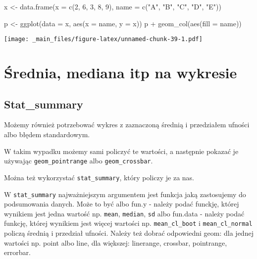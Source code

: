 \documentclass[
]{book}
\newenvironment{Shaded}{\begin{snugshade}}{\end{snugshade}}
\newcommand{\AttributeTok}[1]{\textcolor[rgb]{0.77,0.63,0.00}{#1}}
\newcommand{\DecValTok}[1]{\textcolor[rgb]{0.00,0.00,0.81}{#1}}
\newcommand{\FunctionTok}[1]{\textcolor[rgb]{0.00,0.00,0.00}{#1}}
\newcommand{\NormalTok}[1]{#1}
\newcommand{\OtherTok}[1]{\textcolor[rgb]{0.56,0.35,0.01}{#1}}
\newcommand{\SpecialCharTok}[1]{\textcolor[rgb]{0.00,0.00,0.00}{#1}}
\newcommand{\StringTok}[1]{\textcolor[rgb]{0.31,0.60,0.02}{#1}}
\begin{document}
\begin{Shaded}
\begin{Highlighting}[]
\NormalTok{x }\OtherTok{\textless{}{-}} \FunctionTok{data.frame}\NormalTok{(}\AttributeTok{x =} \FunctionTok{c}\NormalTok{(}\DecValTok{2}\NormalTok{, }\DecValTok{6}\NormalTok{, }\DecValTok{3}\NormalTok{, }\DecValTok{8}\NormalTok{, }\DecValTok{9}\NormalTok{), }\AttributeTok{name =} \FunctionTok{c}\NormalTok{(}\StringTok{"A"}\NormalTok{, }\StringTok{"B"}\NormalTok{, }\StringTok{"C"}\NormalTok{, }\StringTok{"D"}\NormalTok{, }\StringTok{"E"}\NormalTok{))}

\NormalTok{p }\OtherTok{\textless{}{-}} \FunctionTok{ggplot}\NormalTok{(}\AttributeTok{data =}\NormalTok{ x, }\FunctionTok{aes}\NormalTok{(}\AttributeTok{x =}\NormalTok{ name, }\AttributeTok{y =}\NormalTok{ x))}
\NormalTok{p }\SpecialCharTok{+} \FunctionTok{geom\_col}\NormalTok{(}\FunctionTok{aes}\NormalTok{(}\AttributeTok{fill =}\NormalTok{ name))}
\end{Highlighting}
\end{Shaded}

\texttt{[image: \_main\_files/figure-latex/unnamed-chunk-39-1.pdf]}

\hypertarget{ux15brednia-mediana-itp-na-wykresie}{%
\section{Średnia, mediana itp na wykresie}\label{ux15brednia-mediana-itp-na-wykresie}}

\hypertarget{stat_summary}{%
\subsection{Stat\_summary}\label{stat_summary}}

Możemy również potrzebować wykres z zaznaczoną średnią i przedziałem ufności albo błędem standardowym.

W takim wypadku możemy sami policzyć te wartości, a następnie pokazać je używając \texttt{geom\_pointrange} albo \texttt{geom\_crossbar}.

Można też wykorzystać \texttt{stat\_summary}, który policzy je za nas.

W \texttt{stat\_summary} najważniejszym argumentem jest funkcja jaką zastosujemy do podsumowania danych. Może to być albo fun.y - należy podać funckję, której wynikiem jest jedna wartość np. \texttt{mean}, \texttt{median}, \texttt{sd} albo fun.data - należy podać funkcję, której wynikiem jest więcej wartości np. \texttt{mean\_cl\_boot} i \texttt{mean\_cl\_normal} policzą średnią i przedział ufności. Należy też dobrać odpowiedni geom: dla jednej wartości np. point albo line, dla większej: linerange, crossbar, pointrange, errorbar.
\end{document}

